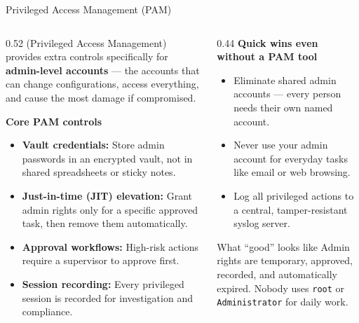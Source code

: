 \documentclass[aspectratio=169]{beamer}  %
\begin{document}
\begin{frame}{Privileged Access Management (PAM)}
    \begin{columns}[T]
        \begin{column}{0.52\textwidth}
            \footnotesize
             (Privileged Access Management) provides extra controls specifically for \textbf{admin-level accounts} --- the accounts that can change configurations, access everything, and cause the most damage if compromised.

            \vspace{0.4em}
            \textbf{Core PAM controls}
            \begin{itemize}
                \item \textbf{Vault credentials:} Store admin passwords in an encrypted vault, not in shared spreadsheets or sticky notes.
                \item \textbf{Just-in-time (JIT) elevation:} Grant admin rights only for a specific approved task, then remove them automatically.
                \item \textbf{Approval workflows:} High-risk actions require a supervisor to approve first.
                \item \textbf{Session recording:} Every privileged session is recorded for investigation and compliance.
            \end{itemize}
        \end{column}
        \begin{column}{0.44\textwidth}
            \footnotesize
            \textbf{Quick wins even without a PAM tool}
            \begin{itemize}
                \item Eliminate shared admin accounts --- every person needs their own named account.
                \item Never use your admin account for everyday tasks like email or web browsing.
                \item Log all privileged actions to a central, tamper-resistant syslog server.
            \end{itemize}

            \begin{exampleblock}{What ``good'' looks like}
                \footnotesize
                Admin rights are temporary, approved, recorded, and automatically expired. Nobody uses \texttt{root} or \texttt{Administrator} for daily work.
            \end{exampleblock}
        \end{column}
    \end{columns}
\end{frame}
\end{document}
